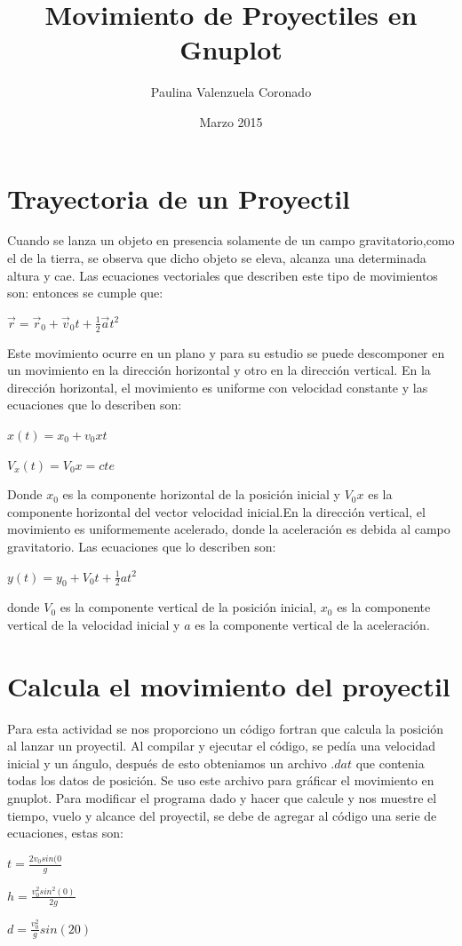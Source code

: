 \documentclass[12pt]{article}
\title{Movimiento de Proyectiles en Gnuplot}
\author{Paulina Valenzuela Coronado}
\date{Marzo 2015}
\begin{document}
\maketitle
\section{Trayectoria de un Proyectil}
Cuando se lanza un objeto en presencia solamente de un campo gravitatorio,como el de la tierra, se observa que dicho objeto se eleva, alcanza una determinada altura y cae. Las ecuaciones vectoriales
que describen este tipo de movimientos son:  
entonces se cumple que:
\begin{center}
$\vec{r}= \vec{r}_0+ \vec{v}_0t+ \frac{1}{2} \vec{a}t^2$ 
\end{center}

Este movimiento ocurre en un plano y para su estudio se puede descomponer en un movimiento en la dirección horizontal y otro en la dirección vertical.
En la dirección horizontal, el movimiento es uniforme con velocidad constante y las ecuaciones que lo describen son: 
\begin{center}
$ x(t)= x_0 + v_0xt$
\end{center}
\begin{center}
$ V_x(t)= V_0x=cte$
\end{center}
Donde $x_0$ es la componente horizontal de la posición inicial y $V_0x$ es la componente horizontal del vector
velocidad inicial.En la dirección vertical, el movimiento es uniformemente acelerado, donde la aceleración es debida al campo gravitatorio. Las ecuaciones que lo describen son: 
\begin{center}
$y(t)=y_0+V_0t+\frac{1}{2}at^2$
\end{center}

donde $V_0$ es la componente vertical de la posición inicial, $x_0$ es la componente vertical de la velocidad
inicial y $a$ es la componente vertical de la aceleración. 
\section{Calcula el movimiento del proyectil}

Para esta actividad se nos proporciono un código fortran que calcula la posición al lanzar un proyectil. Al compilar y ejecutar el código, se pedía una velocidad inicial y un ángulo, después de esto obteniamos un archivo $.dat$ que contenia todas los datos de posición. Se uso este archivo para gráficar el movimiento en gnuplot.
Para modificar el programa dado y hacer que calcule y nos muestre el tiempo, vuelo y alcance del proyectil, se debe de agregar al código una serie de ecuaciones, estas son:
\begin{center}
$ t = \frac{2v_0 sin(0}{g}$
\end{center}
\begin{center}
$h = \frac{v_0^2 sin^2(0)}{2g}$
\end{center}
\begin{center}
$d = \frac{v_0^2}{g} sin(20)$
\end{center}
\end{document}

